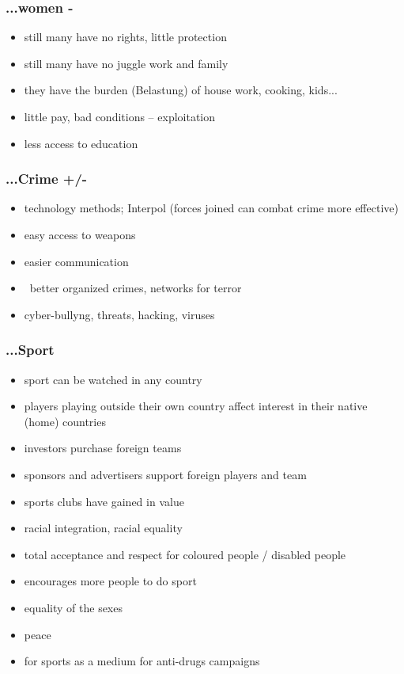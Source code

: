 \documentclass[a5paper,12pt,twoside,titlepage]{scrartcl}
\begin{document}
\subsubsection{...women -}
	\begin{itemize}
		\item still many have no rights, little protection
		\item still many have no juggle work and family
		\item they have the burden (Belastung) of house work, cooking, kids...
		\item little pay, bad conditions -- exploitation 
		\item less access to education 
	\end{itemize}
\subsubsection{...Crime +/-}
	\begin{itemize}
		\item technology methods; Interpol (forces joined can combat crime more effective)
		\item easy access to weapons
		\item easier communication
		\item \textrightarrow\ better organized crimes, networks for terror
		\item cyber-bullyng, threats, hacking, viruses
	\end{itemize}
\subsubsection{...Sport}
	\begin{itemize}
		\item sport can be watched in any country
		\item players playing outside their own country affect interest in their native (home) countries 
		\item investors purchase foreign teams
		\item sponsors and advertisers support foreign players and team 
		\item sports clubs have gained in value
		\item racial integration, racial equality
		\item total acceptance and respect for coloured people / disabled people
		\item encourages more people to do sport
		\item equality of the sexes
		\item peace
		\item for sports as a medium for anti-drugs campaigns
	\end{itemize}
\end{document}
